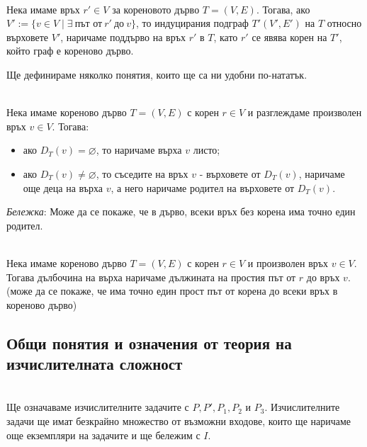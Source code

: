 \documentclass[12pt,twoside,a4paper]{article}
\begin{document}
	\newpage
	\begin{definition}[поддърво]~\\
		\indent Нека имаме връх $r' \in V$ за кореновото дърво $T=(V,E)$. Тогава, ако $V' := \{v \in V \mid \exists \ \text{път от} \ r' \ \text{до} \ v\}$, то индуцирания подграф $T'(V',E')$ на $T$ относно върховете $V'$, наричаме поддърво на връх $r'$ в $T$, като $r'$ се явява корен на $T'$, който граф е кореново дърво.
	\end{definition}
	
	Ще дефинираме няколко понятия, които ще са ни удобни по-нататък.
	
	\begin{definitions}~\\
		\indent Нека имаме кореново дърво $T=(V,E)$ с корен $r \in V$ и разглеждаме произволен връх $v \in V$. Тогава:
		\begin{itemize}
			\item ако $D_T(v) = \varnothing$, то наричаме върха $v$ листо;
			\item ако $D_T(v) \neq \varnothing$, то съседите на връх $v$ - върховете от $D_T(v)$, наричаме още деца на върха $v$, а него наричаме родител на върховете от $D_T(v)$.
		\end{itemize}
		
		\textit{Бележка}: Може да се покаже, че в дърво, всеки връх без корена има точно един родител.
	\end{definitions}
	
	\begin{definition}~\\
		\indent Нека имаме кореново дърво $T=(V,E)$ с корен $r \in V$ и произволен връх $v \in V$. Тогава дълбочина на върха наричаме дължината на простия път от $r$ до връх $v$. (може да се покаже, че има точно един прост път от корена до всеки връх в кореново дърво)
	\end{definition}
	
	\subsection{Общи понятия и означения от теория на изчислителната сложност}
	
	\begin{denotations}~\\
		\indent Ще означаваме изчислителните задачите с $P, P', P_1, P_2$ и $P_3$. Изчислителните задачи ще имат безкрайно множество от възможни входове, които ще наричаме още екземпляри на задачите и ще бележим с $I$.
	\end{denotations}
	
\end{document}
